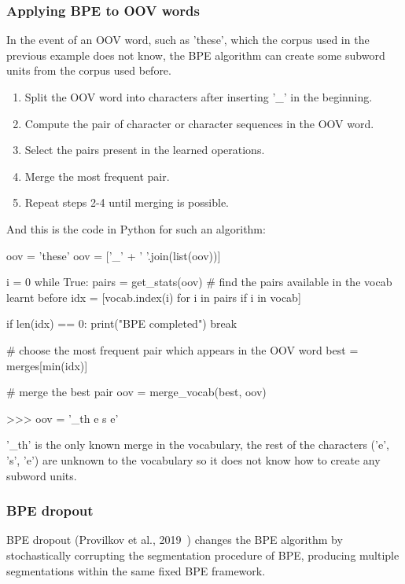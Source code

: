 \subsubsection{Applying BPE to OOV words}

In the event of an OOV word, such as 'these', which the corpus used in the previous example does not know, the BPE algorithm can create some subword units from the corpus used before.

\begin{enumerate}
    \item Split the OOV word into characters after inserting '\_' in the beginning.
    \item Compute the pair of character or character sequences in the OOV word.
    \item Select the pairs present in the learned operations.
    \item Merge the most frequent pair.
    \item Repeat steps 2-4 until merging is possible.
\end{enumerate}

And this is the code in Python for such an algorithm:

\begin{python}
oov = 'these'
oov = ['_' + ' '.join(list(oov))]

i = 0
while True:
    pairs = get_stats(oov)
    # find the pairs available in the vocab learnt before
    idx = [vocab.index(i) for i in pairs if i in vocab]

    if len(idx) == 0:
        print("BPE completed")
        break

    # choose the most frequent pair which appears in the OOV word
    best = merges[min(idx)]

    # merge the best pair
    oov = merge_vocab(best, oov)

>>> oov = '_th e s e'
\end{python}

'\_th' is the only known merge in the vocabulary, the rest of the characters ('e', 's', 'e') are unknown to the vocabulary so it does not know how to create any subword units.

\subsubsection{BPE dropout}

BPE dropout (Provilkov et al., 2019~\cite{provilkov2019bpedropout}) changes the BPE algorithm by stochastically corrupting the segmentation procedure of BPE, producing multiple segmentations within the same fixed BPE framework.

